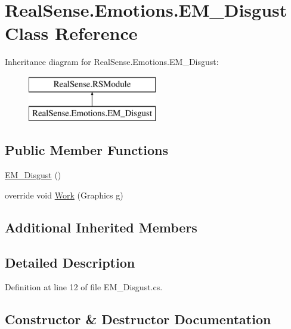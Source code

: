 \hypertarget{class_real_sense_1_1_emotions_1_1_e_m___disgust}{}\section{Real\+Sense.\+Emotions.\+E\+M\+\_\+\+Disgust Class Reference}
\label{class_real_sense_1_1_emotions_1_1_e_m___disgust}
Inheritance diagram for Real\+Sense.\+Emotions.\+E\+M\+\_\+\+Disgust\+:\begin{figure}[H]
\begin{center}
\leavevmode
\includegraphics[height=2.000000cm]{class_real_sense_1_1_emotions_1_1_e_m___disgust}
\end{center}
\end{figure}
\subsection*{Public Member Functions}
\begin{DoxyCompactItemize}
\item 
\hyperlink{class_real_sense_1_1_emotions_1_1_e_m___disgust_aba892f265a554ffe99c81482b48fbed0}{E\+M\+\_\+\+Disgust} ()
\item 
override void \hyperlink{class_real_sense_1_1_emotions_1_1_e_m___disgust_a22cbe3025c32821d53edcb325140ccb1}{Work} (Graphics g)
\end{DoxyCompactItemize}
\subsection*{Additional Inherited Members}


\subsection{Detailed Description}


Definition at line 12 of file E\+M\+\_\+\+Disgust.\+cs.



\subsection{Constructor \& Destructor Documentation}
\mbox{\label{class_real_sense_1_1_emotions_1_1_e_m___disgust_aba892f265a554ffe99c81482b48fbed0}} 
